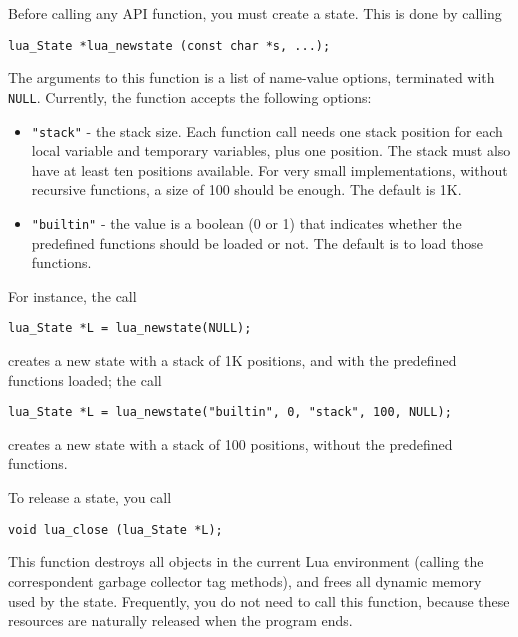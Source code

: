 \documentclass[11pt]{article}
\newcommand{\Deffunc}[1]{\index{#1}}
\begin{document}
Before calling any API function,
you must create a state.
This is done by calling\Deffunc{lua_newstate}
\begin{verbatim}
lua_State *lua_newstate (const char *s, ...);
\end{verbatim}
The arguments to this function is a list of name-value options,
terminated with \verb|NULL|.
Currently, the function accepts the following options:
\begin{itemize}
\item \verb|"stack"| - the stack size.
Each function call needs one stack position for each local variable
and temporary variables, plus one position.
The stack must also have at least ten positions available.
For very small implementations, without recursive functions,
a size of 100 should be enough.
The default is 1K.

\item \verb|"builtin"| - the value is a boolean (0 or 1) that
indicates whether the predefined functions should be loaded or not.
The default is to load those functions.
\end{itemize}
For instance, the call
\begin{verbatim}
lua_State *L = lua_newstate(NULL);
\end{verbatim}
creates a new state with a stack of 1K positions,
and with the predefined functions loaded;
the call
\begin{verbatim}
lua_State *L = lua_newstate("builtin", 0, "stack", 100, NULL);
\end{verbatim}
creates a new state with a stack of 100 positions,
without the predefined functions.

To release a state, you call
\begin{verbatim}
void lua_close (lua_State *L);
\end{verbatim}
This function destroys all objects in the current Lua environment
(calling the correspondent garbage collector tag methods),
and frees all dynamic memory used by the state.
Frequently, you do not need to call this function,
because these resources are naturally released when the program ends.
\end{document}
